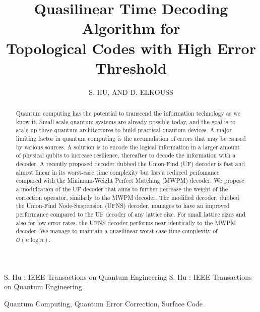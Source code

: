 \documentclass{ieeeaccess}
\newcommand{\m}[1]{\mathcal{#1}}
\begin{document}

\title{Quasilinear Time Decoding Algorithm for \\Topological Codes with High Error Threshold}
\author{
    \uppercase{S. Hu},
    \uppercase{and D. Elkouss}
}
\address[1]{Department of Physics, Delft University of Technology (email: watermarkhu@outlook.com)}
\address[2]{QuTech, Delft University of Technology, Lorentzweg 1
2628CJ Delft, The Netherlands (email: d.elkousscoronas@qutech.nl)}


\markboth
{S. Hu \headeretal: IEEE Transactions on Quantum Engineering}
{S. Hu \headeretal: IEEE Transactions on Quantum Engineering}


\begin{abstract}
    Quantum computing has the potential to transcend the information technology as we know it. Small scale quantum systems are already possible today, and the goal is to scale up these quantum architectures to build practical quantum devices. A major limiting factor in quantum computing is the accumulation of errors that may be caused by various sources. A solution is to encode the logical information in a larger amount of physical qubits to increase resilience, thereafter to decode the information with a decoder. A recently proposed decoder dubbed the Union-Find (UF) decoder is fast and almost linear in its worst-case time complexity but has a reduced perfomance compared with the Minimum-Weight Perfect Matching (MWPM) decoder. We propose a modification of the UF decoder that aims to further decrease the weight of the correction operator, similarly to the MWPM decoder. The modified decoder, dubbed the Union-Find Node-Suspension (UFNS) decoder, manages to have an improved performance compared to the UF decoder of any lattice size. For small lattice sizes and also for low error rates, the UFNS decoder performs near identically to the MWPM decoder. We manage to maintain a quasilinear worst-case time complexity of $\m{O}(n\log{n})$. 
\end{abstract}

\begin{keywords}
    Quantum Computing, Quantum Error Correction, Surface Code
\end{keywords}

\titlepgskip=-15pt
\maketitle








\FloatBarrier
\printbibliography
\EOD
\end{document}
